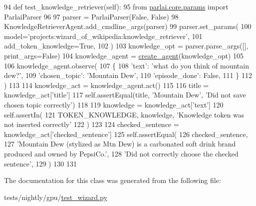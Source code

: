 \begin{DoxyCode}
94     \textcolor{keyword}{def }test\_knowledge\_retriever(self):
95         \textcolor{keyword}{from} \hyperlink{namespaceparlai_1_1core_1_1params}{parlai.core.params} \textcolor{keyword}{import} ParlaiParser
96 
97         parser = ParlaiParser(\textcolor{keyword}{False}, \textcolor{keyword}{False})
98         KnowledgeRetrieverAgent.add\_cmdline\_args(parser)
99         parser.set\_params(
100             model=\textcolor{stringliteral}{'projects:wizard\_of\_wikipedia:knowledge\_retriever'},
101             add\_token\_knowledge=\textcolor{keyword}{True},
102         )
103         knowledge\_opt = parser.parse\_args([], print\_args=\textcolor{keyword}{False})
104         knowledge\_agent = \hyperlink{namespaceparlai_1_1core_1_1agents_a00d77a7e26fb89e8bd900f7b2a02982a}{create\_agent}(knowledge\_opt)
105 
106         knowledge\_agent.observe(
107             \{
108                 \textcolor{stringliteral}{'text'}: \textcolor{stringliteral}{'what do you think of mountain dew?'},
109                 \textcolor{stringliteral}{'chosen\_topic'}: \textcolor{stringliteral}{'Mountain Dew'},
110                 \textcolor{stringliteral}{'episode\_done'}: \textcolor{keyword}{False},
111             \}
112         )
113 
114         knowledge\_act = knowledge\_agent.act()
115 
116         title = knowledge\_act[\textcolor{stringliteral}{'title'}]
117         self.assertEqual(title, \textcolor{stringliteral}{'Mountain Dew'}, \textcolor{stringliteral}{'Did not save chosen topic correctly'})
118 
119         knowledge = knowledge\_act[\textcolor{stringliteral}{'text'}]
120         self.assertIn(
121             TOKEN\_KNOWLEDGE, knowledge, \textcolor{stringliteral}{'Knowledge token was not inserted correctly'}
122         )
123 
124         checked\_sentence = knowledge\_act[\textcolor{stringliteral}{'checked\_sentence'}]
125         self.assertEqual(
126             checked\_sentence,
127             \textcolor{stringliteral}{'Mountain Dew (stylized as Mtn Dew) is a carbonated soft drink brand produced and owned by
       PepsiCo.'},
128             \textcolor{stringliteral}{'Did not correctly choose the checked sentence'},
129         )
130 
131 
\end{DoxyCode}


The documentation for this class was generated from the following file\+:\begin{DoxyCompactItemize}
\item 
tests/nightly/gpu/\hyperlink{test__wizard_8py}{test\+\_\+wizard.\+py}\end{DoxyCompactItemize}
